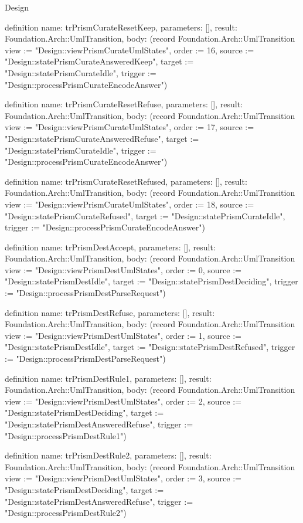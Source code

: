 \begin{lexlean}{Design}
\begin{semanticmodule}
definition{
  name: trPrismCurateResetKeep,
  parameters: [],
  result: Foundation.Arch::UmlTransition,
  body: (record Foundation.Arch::UmlTransition {view := "Design::viewPrismCurateUmlStates", order := 16, source := "Design::statePrismCurateAnsweredKeep", target := "Design::statePrismCurateIdle", trigger := "Design::processPrismCurateEncodeAnswer"})
}

definition{
  name: trPrismCurateResetRefuse,
  parameters: [],
  result: Foundation.Arch::UmlTransition,
  body: (record Foundation.Arch::UmlTransition {view := "Design::viewPrismCurateUmlStates", order := 17, source := "Design::statePrismCurateAnsweredRefuse", target := "Design::statePrismCurateIdle", trigger := "Design::processPrismCurateEncodeAnswer"})
}

definition{
  name: trPrismCurateResetRefused,
  parameters: [],
  result: Foundation.Arch::UmlTransition,
  body: (record Foundation.Arch::UmlTransition {view := "Design::viewPrismCurateUmlStates", order := 18, source := "Design::statePrismCurateRefused", target := "Design::statePrismCurateIdle", trigger := "Design::processPrismCurateEncodeAnswer"})
}

definition{
  name: trPrismDestAccept,
  parameters: [],
  result: Foundation.Arch::UmlTransition,
  body: (record Foundation.Arch::UmlTransition {view := "Design::viewPrismDestUmlStates", order := 0, source := "Design::statePrismDestIdle", target := "Design::statePrismDestDeciding", trigger := "Design::processPrismDestParseRequest"})
}

definition{
  name: trPrismDestRefuse,
  parameters: [],
  result: Foundation.Arch::UmlTransition,
  body: (record Foundation.Arch::UmlTransition {view := "Design::viewPrismDestUmlStates", order := 1, source := "Design::statePrismDestIdle", target := "Design::statePrismDestRefused", trigger := "Design::processPrismDestParseRequest"})
}

definition{
  name: trPrismDestRule1,
  parameters: [],
  result: Foundation.Arch::UmlTransition,
  body: (record Foundation.Arch::UmlTransition {view := "Design::viewPrismDestUmlStates", order := 2, source := "Design::statePrismDestDeciding", target := "Design::statePrismDestAnsweredRefuse", trigger := "Design::processPrismDestRule1"})
}

definition{
  name: trPrismDestRule2,
  parameters: [],
  result: Foundation.Arch::UmlTransition,
  body: (record Foundation.Arch::UmlTransition {view := "Design::viewPrismDestUmlStates", order := 3, source := "Design::statePrismDestDeciding", target := "Design::statePrismDestAnsweredRefuse", trigger := "Design::processPrismDestRule2"})
}


\end{semanticmodule}
\end{lexlean}
